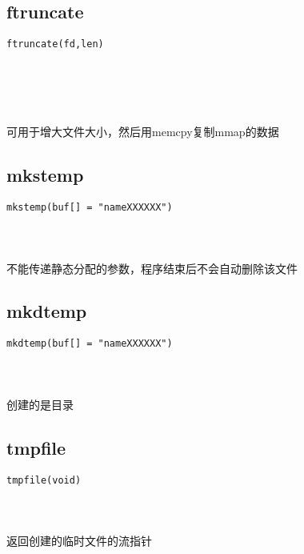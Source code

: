 \documentclass[10pt,a4paper]{article}
\begin{document}
\subsection{ftruncate}
\begin{spacing}{2.0}
\lstset{language=C,numbers=none}
\begin{lstlisting}
ftruncate(fd,len)
\end{lstlisting}
{\large\color[rgb]{0.2,0.4,0.6}{fd:}} \\
{\large\color[rgb]{0.2,0.4,0.6}{len:}}
\paragraph{ \ \ }可用于增大文件大小，然后用memcpy复制mmap的数据
\end{spacing}

\subsection{mkstemp}
\begin{spacing}{2.0}
\lstset{language=C,numbers=none}
\begin{lstlisting}
mkstemp(buf[] = "nameXXXXXX")
\end{lstlisting}
{\large\color[rgb]{0.2,0.4,0.6}{"nameXXXXXX":}}
\paragraph{ \ \ }不能传递静态分配的参数，程序结束后不会自动删除该文件
\end{spacing}

\subsection{mkdtemp}
\begin{spacing}{2.0}
\lstset{language=C,numbers=none}
\begin{lstlisting}
mkdtemp(buf[] = "nameXXXXXX")
\end{lstlisting}
{\large\color[rgb]{0.2,0.4,0.6}{"nameXXXXXX":}}
\paragraph{ \ \ }创建的是目录
\end{spacing}

\subsection{tmpfile}
\begin{spacing}{2.0}
\lstset{language=C,numbers=none}
\begin{lstlisting}
tmpfile(void)
\end{lstlisting}
{\large\color[rgb]{0.2,0.4,0.6}{void:}}
\paragraph{ \ \ }返回创建的临时文件的流指针
\end{spacing}
\end{document}
